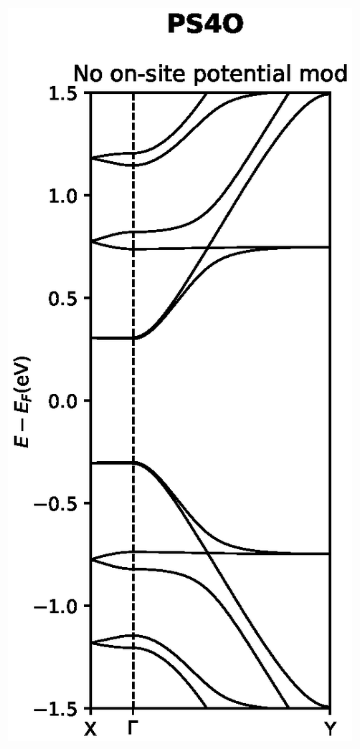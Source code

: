 \begin{figure}[h]
\begin{subfigure}[b]{0.3\textwidth}
    \vspace{-1.5\baselineskip}
    \caption{}
    \label{PS4Odev}
    \end{subfigure}
    ~
    \begin{subfigure}[b]{0.3\textwidth}
    \centering
    \includegraphics[width=\textwidth]{Figures/PS4Onomod.eps}

\end{subfigure}
\end{figure}
